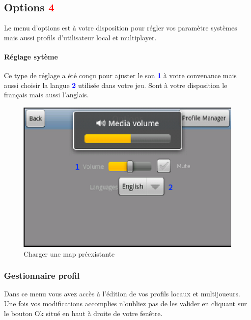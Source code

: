 \subsection{Options \textcolor{red}{4}}
	Le menu d'options est à votre disposition pour régler vos paramètre systèmes
	mais aussi profils d'utilisateur local et multiplayer.
	
	\paragraph{Réglage sytème\\}
	Ce type de réglage a été conçu pour ajuster le son
	\textcolor{blue}{\textbf{1}} à votre convenance mais aussi choisir la langue
	\textcolor{blue}{\textbf{2}} utilisée dans votre jeu. Sont à votre disposition
	le français mais aussi l'anglais.
	
	\begin{figure}[H]
	\centering
		\includegraphics[scale=0.7]{Manuel/Img/4}
		\caption{Charger une map préexistante}
	\end{figure}
	
	\subsubsection{Gestionnaire profil}
		Dans ce menu vous avez accès à l'édition de vos profils locaux et
		multijoueurs. Une fois vos modifications accomplies n'oubliez pas de les
		valider en cliquant sur le bouton Ok situé en haut à droite de votre fenêtre.
